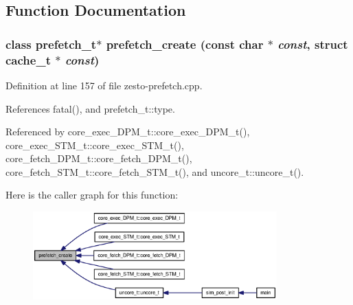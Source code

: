 \subsection{Function Documentation}
\subsubsection[{prefetch\_\-create}]{\setlength{\rightskip}{0pt plus 5cm}class {\bf prefetch\_\-t}$\ast$ prefetch\_\-create (const char $\ast$ {\em const}, \/  struct {\bf cache\_\-t} $\ast$ {\em const})\hspace{0.3cm}{\tt  [read]}}\label{zesto-prefetch_8h_f319863ca6cf2bfc3e545bee5d21ff1d}




Definition at line 157 of file zesto-prefetch.cpp.

References fatal(), and prefetch\_\-t::type.

Referenced by core\_\-exec\_\-DPM\_\-t::core\_\-exec\_\-DPM\_\-t(), core\_\-exec\_\-STM\_\-t::core\_\-exec\_\-STM\_\-t(), core\_\-fetch\_\-DPM\_\-t::core\_\-fetch\_\-DPM\_\-t(), core\_\-fetch\_\-STM\_\-t::core\_\-fetch\_\-STM\_\-t(), and uncore\_\-t::uncore\_\-t().

Here is the caller graph for this function:\nopagebreak
\begin{figure}[H]
\begin{center}
\leavevmode
\includegraphics[width=266pt]{zesto-prefetch_8h_f319863ca6cf2bfc3e545bee5d21ff1d_icgraph}
\end{center}
\end{figure}

